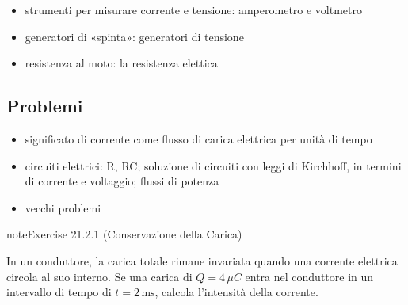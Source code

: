 \documentclass[letterpaper,10pt,italian]{jupyterBook}
\begin{document}
\sphinxAtStartPar
{}
\begin{itemize}
\item {} 
\sphinxAtStartPar
strumenti per misurare corrente e tensione: amperometro e voltmetro

\item {} 
\sphinxAtStartPar
generatori di «spinta»: generatori di tensione

\item {} 
\sphinxAtStartPar
resistenza al moto: la resistenza elettica

\end{itemize}

\sphinxstepscope


\subsection{Problemi}
\label{\detokenize{ch/electromagnetism/electric-current-problems:problemi}}\label{\detokenize{ch/electromagnetism/electric-current-problems:physics-hs-electromagnetism-electric-current-problems}}\label{\detokenize{ch/electromagnetism/electric-current-problems::doc}}\begin{itemize}
\item {} 
\sphinxAtStartPar
significato di corrente come flusso di carica elettrica per unità di tempo

\item {} 
\sphinxAtStartPar
circuiti elettrici: R, RC; soluzione di circuiti con leggi di Kirchhoff, in termini di corrente e voltaggio; flussi di potenza

\item {} 
\sphinxAtStartPar
vecchi problemi

\end{itemize}
 \label{exercise:ch/electromagnetism/electric-current-problems-exercise-0}

\begin{sphinxadmonition}{note}{Exercise 21.2.1 (Conservazione della Carica)}



\sphinxAtStartPar
In un conduttore, la carica totale rimane invariata quando una corrente elettrica circola al suo interno. Se una carica di \(Q = 4 \, \mu C\) entra nel conduttore in un intervallo di tempo di \(t = 2 \, \text{ms}\), calcola l’intensità della corrente.
\end{sphinxadmonition}
 \label{exercise:ch/electromagnetism/electric-current-problems-exercise-1}
\end{document}
